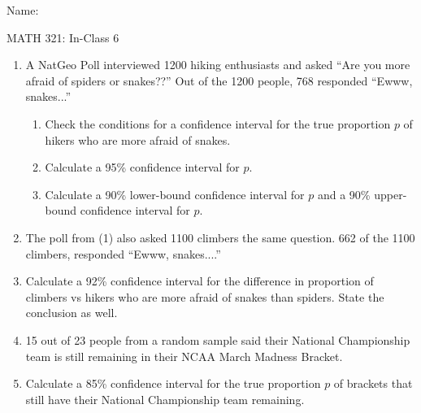 \documentclass{article}
\begin{document}
\hspace{375pt}Name:

\begin{center}
{\Huge MATH 321: In-Class 6}
\end{center}

\bigskip\bigskip




\begin{enumerate}
    \item A NatGeo Poll interviewed 1200 hiking enthusiasts and asked ``Are you more afraid of spiders or snakes??'' Out of the 1200 people, 768 responded ``Ewww, snakes...''
    \begin{enumerate}%
        \item Check the conditions for a confidence interval for the true proportion $p$ of hikers who are more afraid of snakes.\vspace{20pt}
        \item Calculate a 95\% confidence interval for $p$.\vspace{60pt}
        \item Calculate a 90\% lower-bound confidence interval for $p$ and a 90\% upper-bound confidence interval for $p$.\vspace{60pt}%
    \end{enumerate}
    
    \item The poll from (1) also asked 1100 climbers the same question. 662 of the 1100 climbers, responded ``Ewww, snakes....''%
    \item[] Calculate a 92\% confidence interval for the difference in proportion of climbers vs hikers who are more afraid of snakes than spiders. State the conclusion as well.\vspace{120pt}
    
    \item 15 out of 23 people from a random sample said their National Championship team is still remaining in their NCAA March Madness Bracket.%
    \item[] Calculate a 85\% confidence interval for the true proportion $p$ of brackets that still have their National Championship team remaining.\vspace{70pt}\newpage
 

\end{enumerate}
\end{document}
